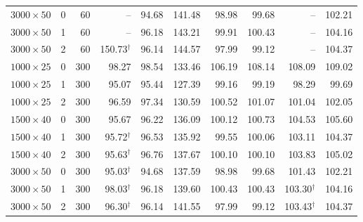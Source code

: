 \begin{table}[H]
\begin{tabular}{lrrrrrrrrr}
$3000\times50$ & 0 & 60 & -- & 94.68 & 141.48 & 98.98 & 99.68 & -- & 102.21\\
$3000\times50$ & 1 & 60 & -- & 96.18 & 143.21 & 99.91 & 100.43 & -- & 104.16\\
$3000\times50$ & 2 & 60 & 150.73$^\dagger$ & 96.14 & 144.57 & 97.99 & 99.12 & -- & 104.37\\
$1000\times25$ & 0 & 300 & 98.27 & 98.54 & 133.46 & 106.19 & 108.14 & 108.09 & 109.02\\
$1000\times25$ & 1 & 300 & 95.07 & 95.44 & 127.39 & 99.16 & 99.19 & 98.29 & 99.69\\
$1000\times25$ & 2 & 300 & 96.59 & 97.34 & 130.59 & 100.52 & 101.07 & 101.04 & 102.05\\
$1500\times40$ & 0 & 300 & 95.67 & 96.22 & 136.09 & 100.12 & 100.73 & 104.53 & 105.60\\
$1500\times40$ & 1 & 300 & 95.72$^\dagger$ & 96.53 & 135.92 & 99.55 & 100.06 & 103.11 & 104.37\\
$1500\times40$ & 2 & 300 & 95.63$^\dagger$ & 96.76 & 137.67 & 100.10 & 100.10 & 103.83 & 105.02\\
$3000\times50$ & 0 & 300 & 95.03$^\dagger$ & 94.68 & 137.59 & 98.98 & 99.68 & 101.43 & 102.21\\
$3000\times50$ & 1 & 300 & 98.03$^\dagger$ & 96.18 & 139.60 & 100.43 & 100.43 & 103.30$^\dagger$ & 104.16\\
$3000\times50$ & 2 & 300 & 96.30$^\dagger$ & 96.14 & 141.55 & 97.99 & 99.12 & 103.43$^\dagger$ & 104.37\\
\bottomrule
\end{tabular}
\end{table}

